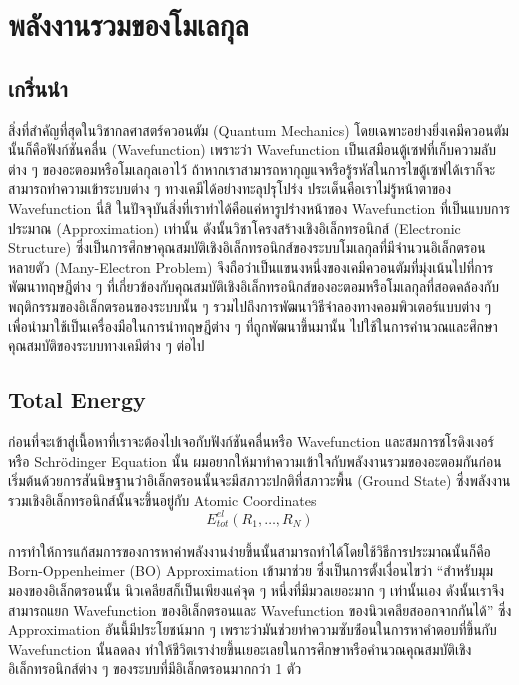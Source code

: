 
\chapter{พลังงานรวมของโมเลกุล}

\section{เกริ่นนำ}

สิ่งที่สำคัญที่สุดในวิชากลศาสตร์ควอนตัม (Quantum Mechanics) โดยเฉพาะอย่างยิ่งเคมีควอนตัมนั้นก็คือฟังก์ชันคลื่น (Wavefunction) เพราะว่า Wavefunction เป็นเสมือนตู้เซฟที่เก็บความลับต่าง ๆ ของอะตอมหรือโมเลกุลเอาไว้ ถ้าหากเราสามารถหากุญแจหรือรู้รหัสในการไขตู้เซฟได้เราก็จะสามารถทำความเข้าระบบต่าง ๆ ทางเคมีได้อย่างทะลุปรุโปร่ง ประเด็นคือเราไม่รู้หน้าตาของ Wavefunction นี่สิ ในปัจจุบันสิ่งที่เราทำได้คือแค่หารูปร่างหน้าของ Wavefunction ที่เป็นแบบการประมาณ (Approximation) เท่านั้น ดังนั้นวิชาโครงสร้างเชิงอิเล็กทรอนิกส์ (Electronic Structure) ซึ่งเป็นการศึกษาคุณสมบัติเชิงอิเล็กทรอนิกส์ของระบบโมเลกุลที่มีจำนวนอิเล็กตรอนหลายตัว (Many-Electron Problem) จึงถือว่าเป็นแขนงหนึ่งของเคมีควอนตัมที่มุ่งเน้นไปที่การพัฒนาทฤษฎีต่าง ๆ ที่เกี่ยวข้องกับคุณสมบัติเชิงอิเล็กทรอนิกส์ของอะตอมหรือโมเลกุลที่สอดคล้องกับพฤติกรรมของอิเล็กตรอนของระบบนั้น ๆ รวมไปถึงการพัฒนาวิธีจำลองทางคอมพิวเตอร์แบบต่าง ๆ เพื่อนำมาใช้เป็นเครื่องมือในการนำทฤษฎีต่าง ๆ ที่ถูกพัฒนาขึ้นมานั้น ไปใช้ในการคำนวณและศึกษาคุณสมบัติของระบบทางเคมีต่าง ๆ ต่อไป

\section{Total Energy}

ก่อนที่จะเข้าสู่เนื้อหาที่เราจะต้องไปเจอกับฟังก์ชันคลื่นหรือ Wavefunction และสมการชโรดิงเงอร์หรือ Schr\"{o}dinger Equation นั้น ผมอยากให้มาทำความเข้าใจกับพลังงานรวมของอะตอมกันก่อน เริ่มต้นด้วยการสันนิษฐานว่าอิเล็กตรอนนั้นจะมีสภาวะปกติที่สภาวะพื้น (Ground State) ซึ่งพลังงานรวมเชิงอิเล็กทรอนิกส์นั้นจะขึ้นอยู่กับ Atomic Coordinates
%
\begin{equation}
    E^{el}_{tot}(R_{1}, \dots, R_{N})
\end{equation}

การทำให้การแก้สมการของการหาค่าพลังงานง่ายขึ้นนั้นสามารถทำได้โดยใช้วิธีการประมาณนั้นก็คือ Born-Oppenheimer (BO) Approximation เข้ามาช่วย ซึ่งเป็นการตั้งเงื่อนไขว่า \enquote{สำหรับมุมมองของอิเล็กตรอนนั้น นิวเคลียสก็เป็นเพียงแค่จุด ๆ หนึ่งที่มีมวลเยอะมาก ๆ เท่านั้นเอง ดังนั้นเราจึงสามารถแยก Wavefunction ของอิเล็กตรอนและ Wavefunction ของนิวเคลียสออกจากกันได้} ซึ่ง Approximation อันนี้มีประโยชน์มาก ๆ เพราะว่ามันช่วยทำความซับซ้่อนในการหาคำตอบที่ขึ้นกับ Wavefunction นั้นลดลง ทำให้ชีวิตเราง่ายขึ้นเยอะเลยในการศึกษาหรือคำนวณคุณสมบัติเชิงอิเล็กทรอนิกส์ต่าง ๆ ของระบบที่มีอิเล็กตรอนมากกว่า 1 ตัว

